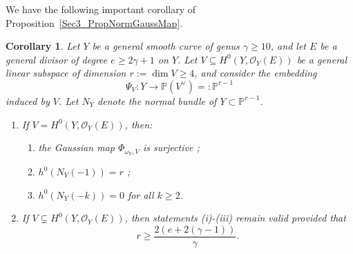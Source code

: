 \documentclass[a4paper,12pt]{amsart}
\newtheorem{coro}[thm]{Corollary}
\def\dim{\operatorname{dim}}
\begin{document}
We have the following important corollary of \textnormal{Proposition~\ref{Sec3_PropNormGaussMap}}.

\begin{coro}
\label{Sec3_PropNormGaussMap_Coro}
Let $Y$ be a general smooth curve of genus $\gamma \geq 10$, and let $E$ be a general divisor of degree $e \geq 2\gamma + 1$ on $Y$. Let $V \subseteq H^0(Y, \mathcal{O}_Y (E))$ be a general linear subspace of dimension $r := \dim V \geq 4$, and consider the embedding
\[
  \Psi_V : Y \to \mathbb{P} (V^{\vee}) =: \mathbb{P}^{r-1}
\]
induced by $V$. Let $N_{Y}$ denote the normal bundle of $Y \subset \mathbb{P}^{r-1}$.
\begin{enumerate}[label=(\alph*), leftmargin=*, font=\rmfamily]
 \item If $V = H^0(Y, \mathcal{O}_Y (E))$, then:
  \begin{enumerate}[label=(\roman*), leftmargin=*, font=\rmfamily]
    \item the Gaussian map $\Phi_{\omega_Y, V}$ is surjective ;

    \item $h^0(N_Y(-1)) = r$ ;

    \item $h^0(N_{Y}(-k)) = 0$ for all $k \geq 2$.
  \end{enumerate}
  \item If $V \subsetneq H^0(Y, \mathcal{O}_Y (E))$, then statements \textnormal{(i)}-\textnormal{(iii)} remain valid provided that
\[
  r \geq \frac{2(e+2(\gamma-1))}{\gamma} .
\]
\end{enumerate}
\end{coro}
\end{document}
